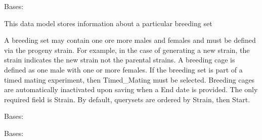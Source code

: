 \documentclass[letterpaper,10pt,english]{sphinxmanual}
\begin{document}
\begin{fulllineitems}
\label{api:mousedb.animal.models.Breeding}
Bases: 

This data model stores information about a particular breeding set

A breeding set may contain one ore more males and females and must be defined via the progeny strain.  For example, in the case of generating a new strain, the strain indicates the new strain not the parental strains.  A breeding cage is defined as one male with one or more females.  If the breeding set is part of a timed mating experiment, then Timed\_Mating must be selected.  Breeding cages are automatically inactivated upon saving when a End date is provided.  The only required field is Strain.  By default, querysets are ordered by Strain, then Start.

\begin{fulllineitems}
\label{api:mousedb.animal.models.Breeding.DoesNotExist}
Bases: 

\end{fulllineitems}


\begin{fulllineitems}
\label{api:mousedb.animal.models.Breeding.Females}
\end{fulllineitems}


\begin{fulllineitems}
\label{api:mousedb.animal.models.Breeding.Male}
\end{fulllineitems}


\begin{fulllineitems}
\label{api:mousedb.animal.models.Breeding.MultipleObjectsReturned}
Bases: 

\end{fulllineitems}


\end{fulllineitems}
\end{document}
